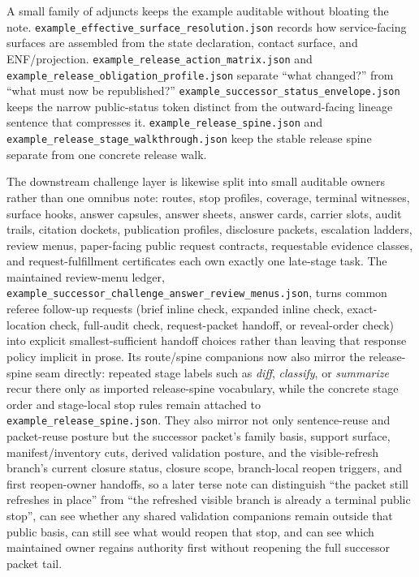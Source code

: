 \documentclass[11pt]{article}
\begin{document}
A small family of adjuncts keeps the example auditable without bloating the note.
\texttt{example\_effective\_surface\_resolution.json} records how service-facing surfaces are assembled from the state declaration, contact surface, and ENF/projection.
\texttt{example\_release\_action\_matrix.json} and \texttt{example\_release\_obligation\_profile.json} separate ``what changed?'' from ``what must now be republished?''
\texttt{example\_successor\_status\_envelope.json} keeps the narrow public-status token distinct from the outward-facing lineage sentence that compresses it.
\texttt{example\_release\_spine.json} and \texttt{example\_release\_stage\_walkthrough.json} keep the stable release spine separate from one concrete release walk.

The downstream challenge layer is likewise split into small auditable owners rather than one omnibus note: routes, stop profiles, coverage, terminal witnesses, surface hooks, answer capsules, answer sheets, answer cards, carrier slots, audit trails, citation dockets, publication profiles, disclosure packets, escalation ladders, review menus, paper-facing public request contracts, requestable evidence classes, and request-fulfillment certificates each own exactly one late-stage task.
The maintained review-menu ledger, \texttt{example\_successor\_challenge\_answer\_review\_menus.json}, turns common referee follow-up requests (brief inline check, expanded inline check, exact-location check, full-audit check, request-packet handoff, or reveal-order check) into explicit smallest-sufficient handoff choices rather than leaving that response policy implicit in prose.
Its route/spine companions now also mirror the release-spine seam directly: repeated stage labels such as \emph{diff}, \emph{classify}, or \emph{summarize} recur there only as imported release-spine vocabulary, while the concrete stage order and stage-local stop rules remain attached to \texttt{example\_release\_spine.json}. They also mirror not only sentence-reuse and packet-reuse posture but the successor packet's family basis, support surface, manifest/inventory cuts, derived validation posture, and the visible-refresh branch's current closure status, closure scope, branch-local reopen triggers, and first reopen-owner handoffs, so a later terse note can distinguish ``the packet still refreshes in place'' from ``the refreshed visible branch is already a terminal public stop'', can see whether any shared validation companions remain outside that public basis, can still see what would reopen that stop, and can see which maintained owner regains authority first without reopening the full successor packet tail.
\end{document}
